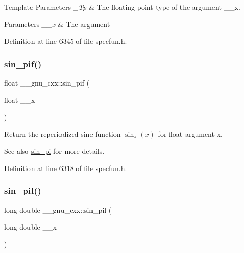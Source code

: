 \begin{DoxyTemplParams}{Template Parameters}
{\em \+\_\+\+Tp} & The floating-\/point type of the argument {\ttfamily \+\_\+\+\_\+x}. \\
\hline
\end{DoxyTemplParams}

\begin{DoxyParams}{Parameters}
{\em \+\_\+\+\_\+x} & The argument \\
\hline
\end{DoxyParams}


Definition at line 6345 of file specfun.\+h.

\mbox{\label{group__mathsf__gnu_ga74fc8e2dd770850e7ea8bf8a28a71777}} 
\subsubsection{\texorpdfstring{sin\+\_\+pif()}{sin\_pif()}}
{\footnotesize\ttfamily float \+\_\+\+\_\+gnu\+\_\+cxx\+::sin\+\_\+pif (\begin{DoxyParamCaption}\item[{float}]{\+\_\+\+\_\+x }\end{DoxyParamCaption})\hspace{0.3cm}{\ttfamily [inline]}}

Return the reperiodized sine function $ \sin_\pi(x) $ for {\ttfamily float} argument {\ttfamily x}.

\begin{DoxySeeAlso}{See also}
\hyperlink{group__mathsf__gnu_ga220f8a9a0477697cff96e84dc911d5f0}{sin\+\_\+pi} for more details. 
\end{DoxySeeAlso}


Definition at line 6318 of file specfun.\+h.

\mbox{\label{group__mathsf__gnu_ga0bda860961b0a121e266b278f260634b}} 
\subsubsection{\texorpdfstring{sin\+\_\+pil()}{sin\_pil()}}
{\footnotesize\ttfamily long double \+\_\+\+\_\+gnu\+\_\+cxx\+::sin\+\_\+pil (\begin{DoxyParamCaption}\item[{long double}]{\+\_\+\+\_\+x }\end{DoxyParamCaption})\hspace{0.3cm}{\ttfamily [inline]}}

